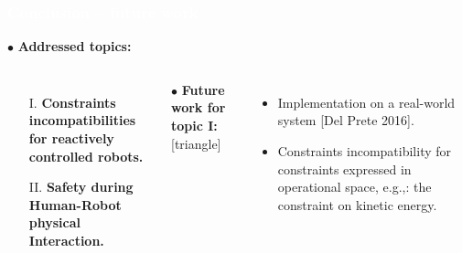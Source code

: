 \begin{frame}[noframenumbering]
\frametitle{{\textcolor{white}{\hspace{0.3cm}Conclusion -- future work}}}
\hspace{-6mm}
$\bullet$ {\color{blue-violet}\textbf{Addressed topics:}}
\begin{columns}
\column{\paperwidth-10mm}
\begin{itemize}
\item[I.]  {\color{red}\textbf{Constraints incompatibilities for reactively controlled robots.}}
\item[II.] {\color{red}\textbf{Safety during Human-Robot physical Interaction.}}
\end{itemize}
\vspace{5mm}
$\bullet$ {\color{ao(english)}\textbf{Future work for topic I:}}
[triangle] 
\begin{itemize}
\item Implementation on a real-world system [Del Prete 2016].
\item Constraints incompatibility for constraints expressed in operational space, e.g.,: the constraint on kinetic energy.
\end{itemize}

\end{columns}
\end{frame}













